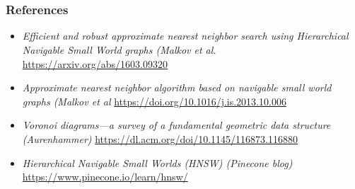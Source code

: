 \documentclass{beamer}
\begin{document}
\section{}
  \begin{frame}
    \frametitle{References}  
    \small
    \begin{itemize}
	\item \textit{Efficient and robust approximate nearest neighbor search using Hierarchical Navigable Small World graphs (Malkov et al.} \url{https://arxiv.org/abs/1603.09320}    

	\item \textit{Approximate nearest neighbor algorithm based on navigable small world graphs (Malkov et al} \url{https://doi.org/10.1016/j.is.2013.10.006}	
	\item \textit{Voronoi diagrams—a survey of a fundamental geometric data structure (Aurenhammer)} \url{https://dl.acm.org/doi/10.1145/116873.116880}
	\item \textit{Hierarchical Navigable Small Worlds (HNSW) (Pinecone blog)} \url{https://www.pinecone.io/learn/hnsw/}
	\end{itemize}
	
  \end{frame}
\end{document}
